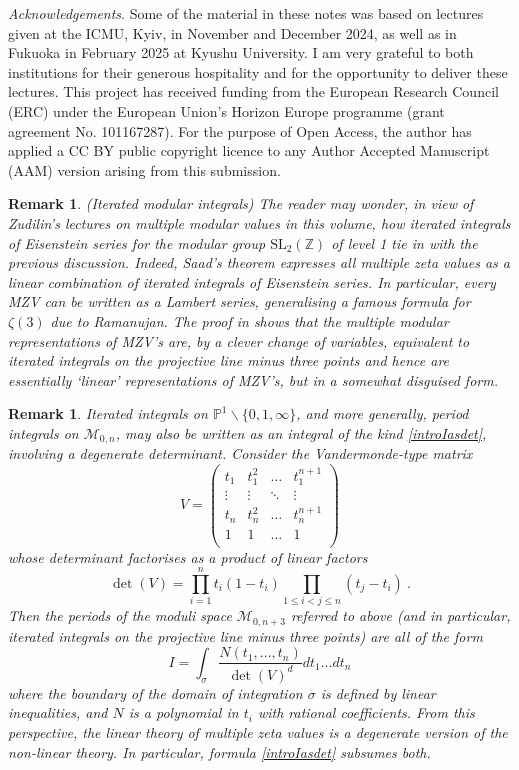 \documentclass[12pt]{amsart}
\newcommand{\PP}{{\mathbb P}}
\newcommand{\ZZ}{{\mathbb Z}}
\theoremstyle{plain}
\newtheorem{remark}[thm]{Remark}
\newcommand{\0}{\color{blue}{\mathsf{0}}}
\begin{document}
\emph{Acknowledgements}.   
Some of the material in these notes was based on lectures given at the ICMU, Kyiv, in November and December 2024, as well as in Fukuoka in February 2025 at Kyushu  University. I am very grateful to both institutions for their generous hospitality and for the opportunity  to deliver these  lectures. 
This project has received funding from the European Research Council (ERC) under the European Union’s Horizon Europe programme (grant agreement No. 101167287).  For the purpose of Open Access, the  author has applied a CC BY public copyright licence to any Author Accepted Manuscript (AAM) version arising from this submission. 



\begin{remark} (Iterated modular integrals) The reader may wonder, 
 in view of Zudilin's lectures on multiple modular values in this volume,  how 
 iterated integrals of Eisenstein series for the modular group $\mathrm{SL}_2(\ZZ)$ of level 1  tie in with the previous discussion. 
Indeed, Saad's theorem \cite{Saad} expresses all multiple zeta values as a linear combination of iterated integrals of Eisenstein series.  In particular, every MZV can be written  as a Lambert series, generalising a famous formula for $\zeta(3)$ due to Ramanujan.
The proof in \cite{Saad} shows that the multiple modular representations of MZV's are, by a clever change of variables, equivalent to iterated integrals on the projective line minus three points and hence are  essentially `linear' representations of MZV's, but  in   a somewhat disguised form. 
\end{remark} 



\begin{remark}Iterated integrals on $\PP^1 \backslash \{0,1,\infty\}$, and more generally, period integrals on $\mathcal{M}_{0,n}$,  may also be written as an integral of the  kind \eqref{introIasdet},  involving a degenerate determinant. Consider the Vandermonde-type  matrix 
\[   V =    \begin{pmatrix} 
t_1 & t_1^2 & \ldots  & t_1^{n+1} \\
\vdots & \vdots & \ddots & \vdots \\
t_n & t_n^2 & \ldots  & t_n^{n+1} \\
 1 & 1 & \ldots & 1 \\
\end{pmatrix} 
 \]
whose determinant factorises as a product of linear factors \[\det(V) =   \prod_{i=1}^n  t_i(1-t_i) \prod_{1\leq i < j \leq n} (t_j -t_i) \ . \]
Then the  periods of the moduli space $\mathcal{M}_{0,n+3}$ referred to above (and in particular, iterated integrals on the projective line minus three points) are all  of the form 
\[ I= \int_{\sigma}  \frac{N(t_1,\ldots, t_n) }{ \det(V)^d} dt_1\ldots dt_n  \] 
where the boundary of the domain of integration $\sigma$ is defined by  linear inequalities, and $N$ is a polynomial in $t_i$ with rational coefficients.   From this perspective, the linear theory of multiple zeta values  is a degenerate version of the non-linear theory. In particular, formula \eqref{introIasdet} subsumes both. 
\end{remark}
\end{document}
